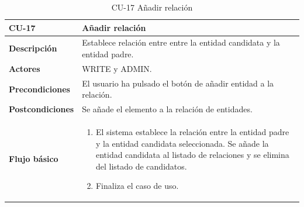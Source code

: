 \begin{table} [H]
    \centering
    \setlength{\leftmargini}{0.4cm}
	\resizebox{15cm}{!} { %
    \begin{tabular}{| m{3cm} | m{12cm} |}   
    \hline
	  \textbf{CU-17} & \textbf{Añadir relación} \\\hline
	  \textbf{Descripción} & Establece relación entre entre la entidad candidata y la entidad padre. \\\hline
	  \textbf{Actores} & WRITE y ADMIN. \\\hline
	  \textbf{Precondiciones} & El usuario ha pulsado el botón de añadir entidad a la relación. \\\hline
	  \textbf{Postcondiciones} & Se añade el elemento a la relación de entidades. \\\hline
	  \textbf{Flujo básico} & 
		\begin{enumerate}
	  	\item El sistema establece la relación entre la entidad padre y la entidad candidata seleccionada. Se añade la entidad candidata al listado de relaciones y se elimina del listado de candidatos.
		\item Finaliza el caso de uso.				
	  \end{enumerate} 	  	  
	  \\\hline
    \end{tabular}
    } %
    \caption{CU-17 Añadir relación}
    \label{tab:cu-anhadir-relacion}
\end{table}

